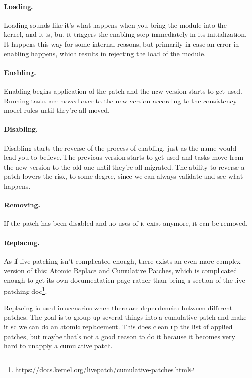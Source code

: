 \paragraph{Loading.} Loading sounds like it's what happens when you bring the module into the kernel, and it is, but it triggers the enabling step immediately in its initialization. It happens this way for some internal reasons, but primarily in case an error in enabling happens, which results in rejecting the load of the module. 

\paragraph{Enabling.} Enabling begins application of the patch and the new version starts to get used. Running tasks are moved over to the new version according to the consistency model rules until they're all moved.

\paragraph{Disabling.} Disabling starts the reverse of the process of enabling, just as the name would lead you to believe. The previous version starts to get used and tasks move from the new version to the old one until they're all migrated. The ability to reverse a patch lowers the risk, to some degree, since we can always validate and see what happens. 

\paragraph{Removing.} If the patch has been disabled and no uses of it exist anymore, it can be removed.

\paragraph{Replacing.} As if live-patching isn't complicated enough, there exists an even more complex version of this: Atomic Replace and Cumulative Patches, which is complicated enough to get its own documentation page rather than being a section of the live patching doc\footnote{ \url{https://docs.kernel.org/livepatch/cumulative-patches.html} }.

Replacing is used in scenarios when there are dependencies between different patches. The goal is to group up several things into a cumulative patch and make it so we can do an atomic replacement. This does clean up the list of applied patches, but maybe that's not a good reason to do it because it becomes very hard to unapply a cumulative patch.

